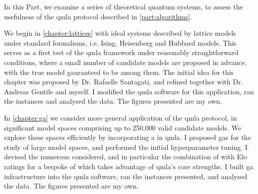 In this Part, we examine a series of theoretical quantum systems, 
    to assess the usefulness of the \gls{qmla} protocol described in \cref{part:algorithms}. 
\par 
\vspace{1cm}

We begin in \cref{chapter:lattices} with ideal systems described by lattice models 
    under standard formalisms, i.e. Ising, Heisenberg and Hubbard models. 
This serves as a first test of the \gls{qmla} framework under reasonably straightforward
    conditions, where a small number of candidate models are proposed in advance, 
    with the true model gauranteed to be among them. 
The initial idea for this chapter was proposed by Dr. Rafaelle Santagati, 
    and refined together with Dr. Andreas Gentile and myself. 
I modified the \gls{qmla} software for this application, 
    ran the \glspl{instance} and analysed the data. 
The figures presented are my own.

\par 
\vspace{1cm}
In \cref{chapter:ga} we consider more general application of the \gls{qmla} protocol, 
    in significant model spaces comprising up to 250,000 valid candidate models. 
We explore these spaces efficiently by incorporating a  in \gls{qmla}. 
I proposed \glspl{ga} for the study of large model spaces, 
    and performed the initial hyperparameter tuning. 
I devised the numerous  considered, 
    and in particular the combination of 
    with Elo ratings for a bespoke \gls{of} which takes advantage of \gls{qmla}'s core strengths. 
I built \gls{ga} infrastructure into the \gls{qmla} software, 
    ran the \glspl{instance} presented, and analysed the data.
The figures presented are my own. 
